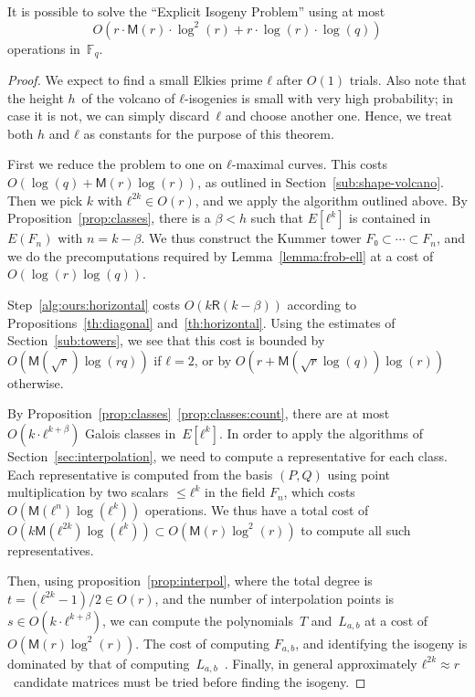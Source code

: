 \documentclass{lms}
\def\cout#1{\mathsf{#1}}
\newcommand{\F}{\mathbb{F}}
\newcommand{\MM}{\cout{M}}
\newcommand{\RR}{\cout{R}}
\begin{document}
\begin{thm*}
It is possible to solve the “Explicit Isogeny Problem”
using at most
\[ O(r · \MM(r) · \log^2(r) + r · \log(r) · \log(q))\]
operations in~$\F_q$.
\end{thm*}
\begin{proof}
  We expect to find a small Elkies prime $ℓ$ after $O(1)$ trials. Also
  note that the height $h$~of the volcano of $ℓ$-isogenies is small
  with very high probability; in case it is not, we can simply
  discard~$ℓ$ and choose another one. Hence, we treat both $h$ and $ℓ$
  as constants for the purpose of this theorem.

  First we reduce the problem to one on $ℓ$-maximal curves. This costs
  $O(\log(q) + \MM(r)\log(r))$, as outlined in
  Section~\ref{sub:shape-volcano}.  Then we pick $k$ with
  $ℓ^{2k} ∈ O(r)$, and we apply the algorithm outlined above. By
  Proposition~\ref{prop:classes}, there is a $β<h$ such that $E[ℓ^k]$
  is contained in $E(F_n)$ with $n=k-β$. We thus construct the Kummer
  tower $F₀⊂\cdots⊂F_n$, and we do the precomputations required by
  Lemma~\ref{lemma:frob-ell} at a cost of $O(\log(r)\log(q))$.

  Step~\ref{alg:ours:horizontal} costs $O(k\RR(k-\beta))$ according to
  Propositions~\ref{th:diagonal} and~\ref{th:horizontal}. Using the
  estimates of Section~\ref{sub:towers}, we see that this cost is
  bounded by $O(\MM(\sqrt{r})\log(rq))$ if $ℓ=2$, or by
  $O(r +\MM(\sqrt{r}\log(q))\log(r))$ otherwise.

  By Proposition~\ref{prop:classes}~\ref{prop:classes:count}, there
  are at most~$O(k· ℓ^{k+β})$ Galois classes in~$E[ℓ^k]$. In order to
  apply the algorithms of Section~\ref{sec:interpolation}, we need to
  compute a representative for each class. Each representative is
  computed from the basis $(P,Q)$ using point multiplication by two
  scalars $≤ℓ^k$ in the field $F_n$, which costs
  $O(\MM(ℓ^n)\log(ℓ^k))$ operations. We thus have a total cost of
  $O(k\MM(ℓ^{2k})\log(ℓ^k)) ⊂ O(\MM(r)\log^2(r))$ to compute all such representatives.

  Then, using proposition~\ref{prop:interpol}, where the total degree
  is~$t = (ℓ^{2k}-1)/2∈O(r)$, and the number of interpolation points
  is $s∈O(k·ℓ^{k+β})$, we can compute the polynomials~$T$
  and~$L_{a,b}$ at a cost of~$O(\MM(r)\log^2(r))$.
  The cost of computing $F_{a,b}$, and identifying the isogeny is
  dominated by that of computing~$L_{a,b}$~\cite[§3.3]{df10}.
  Finally, in general approximately $ℓ^{2k} ≈ r$~candidate matrices
  must be tried before finding the isogeny.
\end{proof}
\end{document}
